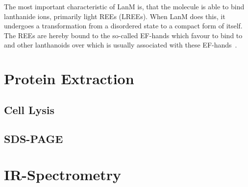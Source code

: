 The most important characteristic of LanM is, that the molecule is able to bind lanthanide ions, primarily light REEs (LREEs).
When LanM does this, it undergoes a transformation from a disordered state to a compact form of itself.
The REEs are hereby bound to the so-called EF-hands which favour to bind to  and other lanthanoids over  which is usually associated with these EF-hands~\cite{lanmstructure}.


\section{Protein Extraction\authorB{}}

\subsection{Cell Lysis}

\subsection{SDS-PAGE}


\section{IR-Spectrometry\authorB{}}